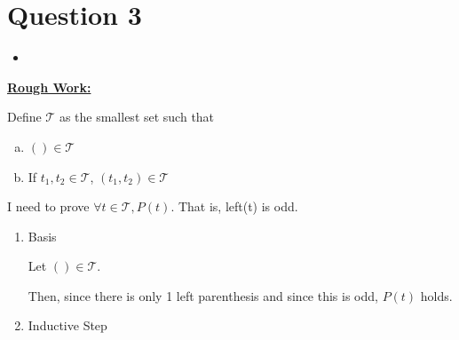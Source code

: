 \documentclass[12pt]{article}
\begin{document}





\section*{Question 3}

\begin{itemize}
    \item
\end{itemize}

\bigskip

\begin{mdframed}
    \underline{\textbf{Rough Work:}}

    \bigskip

    Define $\mathcal{T}$ as the smallest set such that

    \begin{enumerate}[a.]
        \item $() \in \mathcal{T}$
        \item If $t_1,t_2 \in \mathcal{T}$, $(t_1,t_2) \in \mathcal{T}$
    \end{enumerate}

    \bigskip

    I need to prove $\forall t \in \mathcal{T}, P(t)$. That is,
    left(t) is odd.

    \begin{enumerate}
        \item Basis

        \begin{mdframed}
        Let $() \in \mathcal{T}$.

        \bigskip

        Then, since there is only 1 left parenthesis and since this is odd,
        $P(t)$ holds.
        \end{mdframed}

        \item Inductive Step
    \end{enumerate}
\end{mdframed}
\end{document}
